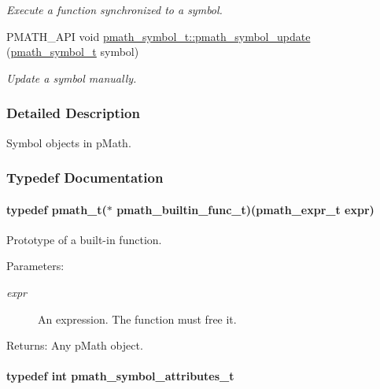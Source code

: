 \begin{CompactItemize}
\begin{CompactList}\small\item\em Execute a function synchronized to a symbol. \item\end{CompactList}\item 
PMATH\_\-API void \hyperlink{group__symbols_g7cd56e2b77ac13a11f1b6f7fd13ba357}{pmath\_\-symbol\_\-t::pmath\_\-symbol\_\-update} (\hyperlink{classpmath__symbol__t}{pmath\_\-symbol\_\-t} symbol)
\begin{CompactList}\small\item\em Update a symbol manually. \item\end{CompactList}\end{CompactItemize}


\subsubsection{Detailed Description}
Symbol objects in pMath. 

\subsubsection{Typedef Documentation}
\hypertarget{group__symbols_g4a74d7aeade34fc26c04ffde22ab1a1a}{
\paragraph[{pmath\_\-builtin\_\-func\_\-t}]{\setlength{\rightskip}{0pt plus 5cm}typedef {\bf pmath\_\-t}($\ast$ {\bf pmath\_\-builtin\_\-func\_\-t})({\bf pmath\_\-expr\_\-t} expr)}\hfill}
\label{group__symbols_g4a74d7aeade34fc26c04ffde22ab1a1a}


Prototype of a built-in function. 

\begin{Desc}
\item[Parameters:]
\begin{description}
\item[{\em expr}]An expression. The function must free it. \end{description}
\end{Desc}
\begin{Desc}
\item[Returns:]Any pMath object. \end{Desc}
\hypertarget{group__symbols_g5d508ec0d32d617b6c642de54907ee17}{
\paragraph[{pmath\_\-symbol\_\-attributes\_\-t}]{\setlength{\rightskip}{0pt plus 5cm}typedef int {\bf pmath\_\-symbol\_\-attributes\_\-t}}\hfill}
\label{group__symbols_g5d508ec0d32d617b6c642de54907ee17}


